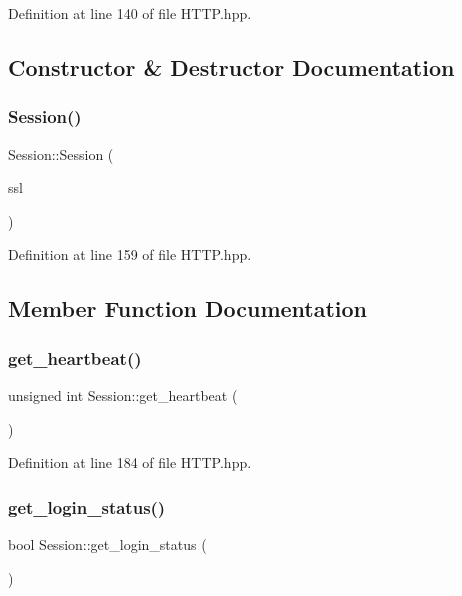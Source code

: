 Definition at line 140 of file H\+T\+T\+P.\+hpp.



\subsection{Constructor \& Destructor Documentation}
\mbox{\label{class_session_a2fdcb68a082443ed916d0a4821443e45}} 
\subsubsection{\texorpdfstring{Session()}{Session()}}
{\footnotesize\ttfamily Session\+::\+Session (\begin{DoxyParamCaption}\item[{S\+SL $\ast$}]{ssl }\end{DoxyParamCaption})}



Definition at line 159 of file H\+T\+T\+P.\+hpp.



\subsection{Member Function Documentation}
\mbox{\label{class_session_a17b56b5b64e8952207b5d3cd3f6ea715}} 
\subsubsection{\texorpdfstring{get\+\_\+heartbeat()}{get\_heartbeat()}}
{\footnotesize\ttfamily unsigned int Session\+::get\+\_\+heartbeat (\begin{DoxyParamCaption}{ }\end{DoxyParamCaption})}



Definition at line 184 of file H\+T\+T\+P.\+hpp.

\mbox{\label{class_session_a8f6a35778f3f4a79ccd1cc4c681e33f0}} 
\subsubsection{\texorpdfstring{get\+\_\+login\+\_\+status()}{get\_login\_status()}}
{\footnotesize\ttfamily bool Session\+::get\+\_\+login\+\_\+status (\begin{DoxyParamCaption}{ }\end{DoxyParamCaption})}



